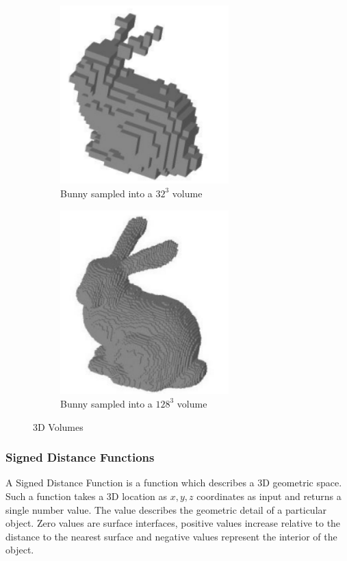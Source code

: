 \begin{figure}[t!] 
	\centering
	\begin{subfigure}[b]{6.8cm}
		\includegraphics[width=6.5cm]{images/literature/bunnyVol32}
		\caption{Bunny sampled into a ${32}^3$ volume}
		\label{fig:Volume_Example32}
	\end{subfigure}%
	\begin{subfigure}[b]{6.8cm}
		\includegraphics[width=6.5cm]{images/literature/bunnyVol128}
		\caption{Bunny sampled into a ${128}^3$ volume}
		\label{fig:Volume_Example128}
	\end{subfigure}%
	\caption{3D Volumes \cite{Passalis07General}}
	\label{fig:VolExamples}
\end{figure}

\subsubsection{Signed Distance Functions}

A Signed Distance Function \cite{Curless96Volumetric} is a function which describes a 3D geometric space. Such a function takes a 3D location as $x,y,z$ coordinates as input and returns a single number value. The value describes the geometric detail of a particular object. Zero values are surface interfaces, positive values increase relative to the distance to the nearest surface and negative values represent the interior of the object. \\

